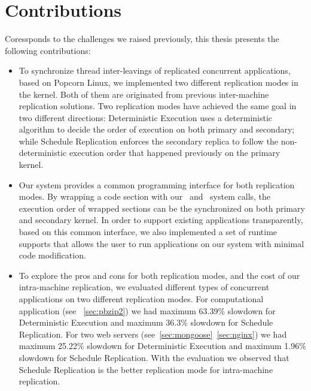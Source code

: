 
\section{Contributions}

Coressponds to the challenges we raised previously, this thesis presents the following contributions:

\begin{itemize}
\item To synchronize thread inter-leavings of replicated concurrent applications, based on Popcorn Linux, we implemented two different replication modes in the kernel. Both of them are originated from previous inter-machine replication solutions. Two replication modes have achieved the same goal in two different directions: Deterministic Execution uses a deterministic algorithm to decide the order of execution on both primary and secondary; while Schedule Replication enforces the secondary replica to follow the non-deterministic execution order that happened previously on the primary kernel.

\item Our system provides a common programming interface for both replication modes. By wrapping a code section with our \detstart\ and \detend\ system calls, the execution order of wrapped sections can be the synchronized on both primary and secondary kernel. In order to support existing applications transparently, based on this common interface, we also implemented a set of runtime supports that allows the user to run applications on our system with minimal code modification.

\item To explore the pros and cons for both replication modes, and the cost of our intra-machine replication, we evaluated different types of concurrent applications on two different replication modes. For computational application (see ~\ref{sec:pbzip2}) we had maximum 63.39\%  slowdown for Deterministic Execution and maximum 36.3\% slowdown for Schedule Replication. For two web servers (see~\ref{sec:mongoose}~\ref{sec:nginx}) we had maximum 25.22\% slowdown for Deterministic Execution and maximum 1.96\% slowdown for Schedule Replication. With the evaluation we observed that Schedule Replication is the better replication mode for intra-machine replication.

\end{itemize}

